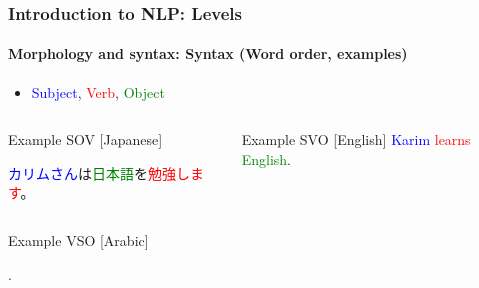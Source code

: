 \documentclass[xcolor=table]{beamer}
\begin{document}
\begin{frame}
\frametitle{Introduction to NLP: Levels}
\framesubtitle{Morphology and syntax: Syntax (Word order, examples)}

\begin{itemize}
	\item \textcolor{blue}{Subject}, \textcolor{red}{Verb}, \textcolor{green}{Object}
\end{itemize}

\begin{columns}
\begin{column}{0.54\textwidth}
	\begin{exampleblock}{Example SOV [Japanese]}
		\small
		\begin{CJK}{UTF8}{min}
			\textcolor{blue}{カリムさん}は\textcolor{green}{日本語}を\textcolor{red}{勉強します}。
		\end{CJK}
	\end{exampleblock}
\end{column}
%
\begin{column}{0.42\textwidth}
	\begin{exampleblock}{Example SVO [English]}
		\textcolor{blue}{Karim} \textcolor{red}{learns} \textcolor{green}{English}.
	\end{exampleblock}
\end{column}%
\end{columns}
\begin{columns}
\begin{column}{0.49\textwidth}
	\begin{exampleblock}{Example VSO [Arabic]}
		\begin{flushright}
			\color{black}.
			\color{green} %
			\color{blue}  
			\color{red}  
		\end{flushright}
	\end{exampleblock}
\end{column}
\end{columns}

\end{frame}
\end{document}
